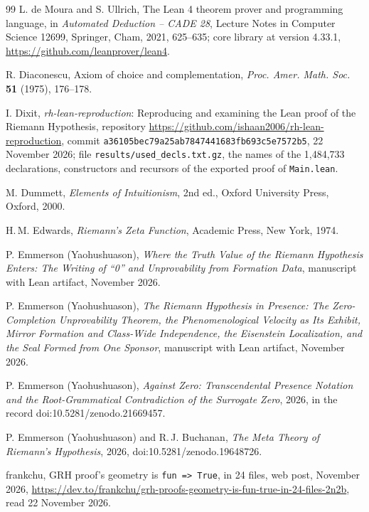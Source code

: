\documentclass[11pt]{article}
\theoremstyle{definition}
\theoremstyle{remark}
\DeclareRobustCommand{\lean}[1]{{\renewcommand{\_}{\textunderscore\allowbreak}\texttt{#1}}}
\begin{document}
\begin{thebibliography}{99}
 L. de Moura and S. Ullrich, The Lean 4 theorem prover and programming language, in \emph{Automated Deduction -- CADE 28}, Lecture Notes in Computer Science 12699, Springer, Cham, 2021, 625--635; core library at version 4.33.1, \url{https://github.com/leanprover/lean4}.

 R. Diaconescu, Axiom of choice and complementation, \emph{Proc. Amer. Math. Soc.} \textbf{51} (1975), 176--178.

 I. Dixit, \emph{rh-lean-reproduction}: Reproducing and examining the Lean proof of the Riemann Hypothesis, repository \url{https://github.com/ishaan2006/rh-lean-reproduction}, commit \nolinkurl{a36105bec79a25ab7847441683fb693c5e7572b5}, 22 November 2026; file \nolinkurl{results/used_decls.txt.gz}, the names of the 1{,}484{,}733 declarations, constructors and recursors of the exported proof of \lean{Main.lean}.

 M. Dummett, \emph{Elements of Intuitionism}, 2nd ed., Oxford University Press, Oxford, 2000.

 H.\,M. Edwards, \emph{Riemann's Zeta Function}, Academic Press, New York, 1974.

 P. Emmerson (Yaohushuason), \emph{Where the Truth Value of the Riemann Hypothesis Enters: The Writing of ``0'' and Unprovability from Formation Data}, manuscript with Lean artifact, November 2026.

 P. Emmerson (Yaohushuason), \emph{The Riemann Hypothesis in Presence: The Zero-Completion Unprovability Theorem, the Phenomenological Velocity as Its Exhibit, Mirror Formation and Class-Wide Independence, the Eisenstein Localization, and the Seal Formed from One Sponsor}, manuscript with Lean artifact, November 2026.

 P. Emmerson (Yaohushuason), \emph{Against Zero: Transcendental Presence Notation and the Root-Grammatical Contradiction of the Surrogate Zero}, 2026, in the record doi:10.5281/zenodo.21669457.

 P. Emmerson (Yaohushuason) and R.\,J. Buchanan, \emph{The Meta Theory of Riemann's Hypothesis}, 2026, doi:10.5281/zenodo.19648726.

 frankchu, GRH proof's geometry is \lean{fun \_ \_ \_ => True}, in 24 files, web post, November 2026, \url{https://dev.to/frankchu/grh-proofs-geometry-is-fun-true-in-24-files-2n2b}, read 22 November 2026.


\end{thebibliography}
\end{document}
